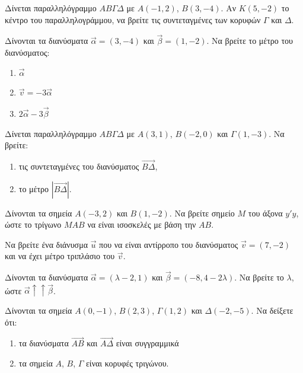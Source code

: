 \documentclass{presentation}
\begin{document}
\begin{askisi}
  Δίνεται παραλληλόγραμμο $ABΓΔ$ με $A(-1, 2)$, $B(3, -4)$. Αν $K(5, -2)$ το κέντρο του παραλληλογράμμου, να βρείτε τις συντεταγμένες των κορυφών $Γ$ και $Δ$.
\end{askisi}

\begin{askisi}
  Δίνονται τα διανύσματα $\vec{\alpha} = (3, -4)$ και $\vec{\beta} = (1, -2)$. Να βρείτε το μέτρο του διανύσματος:
  \begin{enumerate}
    \item $\vec{\alpha}$
    \item $\vec{v} = -3\vec{\alpha}$
    \item $2\vec{\alpha} - 3\vec{\beta}$
  \end{enumerate}
\end{askisi}

\begin{askisi}
  Δίνεται παραλληλόγραμμο $AB\Gamma\Delta$ με $A(3, 1)$, $B(-2, 0)$ και $\Gamma(1, -3)$.
  Να βρείτε:
  \begin{enumerate}
    \item τις συντεταγμένες του διανύσματος $\overrightarrow{BΔ}$,
    \item το μέτρο $|\overrightarrow{BΔ}|$.
  \end{enumerate}
\end{askisi}

\begin{askisi}
  Δίνονται τα σημεία $A(-3, 2)$ και $B(1, -2)$. Να βρείτε σημείο $M$ του άξονα $y'y$, ώστε το τρίγωνο $MAB$ να είναι ισοσκελές με βάση την $AB$.
\end{askisi}

\begin{askisi}
  Να βρείτε ένα διάνυσμα $\vec{u}$ που να είναι αντίρροπο του διανύσματος $\vec{v} = (7, -2)$ και να έχει μέτρο τριπλάσιο του $\vec{v}$.
\end{askisi}

\begin{askisi}
  Δίνονται τα διανύσματα $\vec{\alpha} = (\lambda - 2, 1)$ και $\vec{\beta} = (-8, 4 - 2\lambda)$.
  Να βρείτε το $\lambda$, ώστε $\vec{\alpha} \uparrow\uparrow \vec{\beta}$.
\end{askisi}

\begin{askisi}
  Δίνονται τα σημεία $A(0, -1)$, $B(2, 3)$, $\Gamma(1, 2)$ και $\Delta(-2, -5)$.
  Να δείξετε ότι:
  \begin{enumerate}
    \item τα διανύσματα $\overrightarrow{AB}$ και $\overrightarrow{AΔ}$ είναι συγγραμμικά
    \item τα σημεία $A$, $B$, $\Gamma$ είναι κορυφές τριγώνου.
  \end{enumerate}
\end{askisi}
\end{document}
